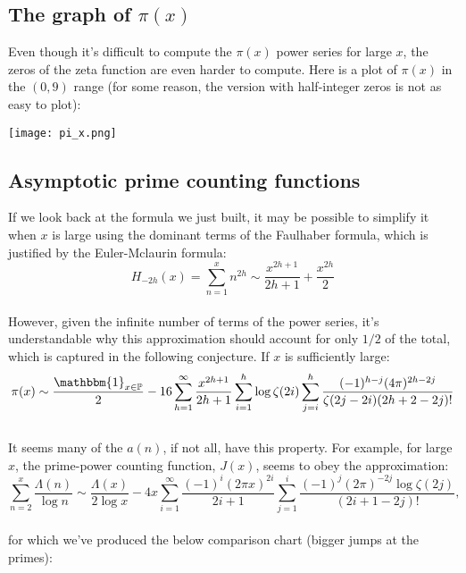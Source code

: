 \documentclass[12pt]{article}
\begin{document}
\newpage 

\subsection{The graph of $\pi(x)$}

Even though it's difficult to compute the  $\pi(x)$ power series for large $x$, the zeros of the zeta function are even harder to compute. Here is a plot of $\pi(x)$ in the $(0,9)$ range (for some reason, the version with half-integer zeros is not as easy to plot):\\
\begin{center}
\texttt{[image: pi\_x.png]}
\end{center}

\subsection{Asymptotic prime counting functions} \label{asym}
If we look back at the formula we just built, it may be possible to simplify it when $x$ is large using the dominant terms of the Faulhaber formula, which is justified by the Euler-Mclaurin formula:
\begin{equation} \nonumber
H_{-2h}(x)=\sum_{n=1}^{x}n^{2h} \sim \frac{x^{2h+1}}{2h+1}+\frac{x^{2h}}{2}
\end{equation}\\
\indent However, given the infinite number of terms of the power series, it's understandable why this approximation should account for only $1/2$ of the total, which is captured in the following conjecture. If $x$ is sufficiently large:
\begin{equation} \nonumber
\pi(x) \sim \frac{\mathbbm{1}_{x\in \mathbb{P}}}{2}-16\sum _{h=1}^{\infty}\frac{x^{2h+1}}{2h+1}\sum _{i=1}^h \log\zeta(2i)\sum _{j=i}^{h}\frac{(-1)^{h-j}(4\pi )^{2h-2j}}{\zeta(2j-2i)(2h+2-2j)!} 
\end{equation}\\
\indent It seems many of the $a(n)$, if not all, have this property. For example, for large $x$, the prime-power counting function, $J(x)$, seems to obey the approximation:
\begin{equation} \nonumber
\sum_{n=2}^{x}\frac{\Lambda(n)}{\log{n}} \sim \frac{\Lambda(x)}{2\log{x}}-4 x\sum_{i=1}^{\infty}\frac{(-1)^i(2\pi x)^{2i}}{2i+1}\sum_{j=1}^{i}\frac{(-1)^j (2\pi)^{-2j}\log{\zeta(2j)}}{(2i+1-2j)!} \text{,}
\end{equation}\\
\noindent for which we've produced the below comparison chart (bigger jumps at the primes):
\end{document}
